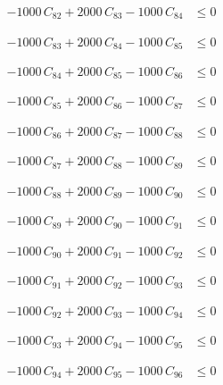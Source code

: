 \documentclass[a4paper,11pt]{article}
\begin{document}
\begin{align}
-1000\,C_{82} + 2000\,C_{83} - 1000\,C_{84} &\leq 0 \nonumber
\end{align}

\begin{align}
-1000\,C_{83} + 2000\,C_{84} - 1000\,C_{85} &\leq 0 \nonumber
\end{align}

\begin{align}
-1000\,C_{84} + 2000\,C_{85} - 1000\,C_{86} &\leq 0 \nonumber
\end{align}

\begin{align}
-1000\,C_{85} + 2000\,C_{86} - 1000\,C_{87} &\leq 0 \nonumber
\end{align}

\begin{align}
-1000\,C_{86} + 2000\,C_{87} - 1000\,C_{88} &\leq 0 \nonumber
\end{align}

\begin{align}
-1000\,C_{87} + 2000\,C_{88} - 1000\,C_{89} &\leq 0 \nonumber
\end{align}

\begin{align}
-1000\,C_{88} + 2000\,C_{89} - 1000\,C_{90} &\leq 0 \nonumber
\end{align}

\begin{align}
-1000\,C_{89} + 2000\,C_{90} - 1000\,C_{91} &\leq 0 \nonumber
\end{align}

\begin{align}
-1000\,C_{90} + 2000\,C_{91} - 1000\,C_{92} &\leq 0 \nonumber
\end{align}

\begin{align}
-1000\,C_{91} + 2000\,C_{92} - 1000\,C_{93} &\leq 0 \nonumber
\end{align}

\begin{align}
-1000\,C_{92} + 2000\,C_{93} - 1000\,C_{94} &\leq 0 \nonumber
\end{align}

\begin{align}
-1000\,C_{93} + 2000\,C_{94} - 1000\,C_{95} &\leq 0 \nonumber
\end{align}

\begin{align}
-1000\,C_{94} + 2000\,C_{95} - 1000\,C_{96} &\leq 0 \nonumber
\end{align}
\end{document}
